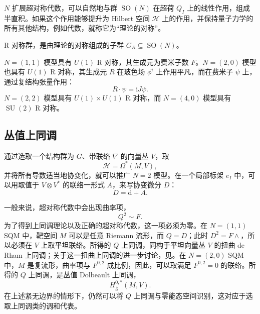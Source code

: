$N$ 扩展超对称代数，可以自然地与群 $\operatorname{SO}(N)$ 在超荷 $Q_I$ 上的线性作用，组成半直积。如果这个作用能够提升为 Hilbert 空间 $\mathcal{H}$ 上的作用，并保持量子力学的所有其他结构，例如代数，就称它为“理论的对称”。

\begin{definition}\label{def:3.1}
R 对称群，是由理论的对称组成的子群 $G_R\subseteq\operatorname{SO}(N)$。
\end{definition}

\begin{example*}
$N=(1,1)$ 模型具有 $U(1)$ R 对称，其生成元为费米子数 $F$。$N=(2,0)$ 模型也具有 $U(1)$ R 对称，其生成元 $R$ 在玻色场 $\phi^i$ 上作用平凡，而在费米子 $\psi$ 上，通过复结构张量作用：
\[
R\cdot\psi=\mathrm{i}J\psi.
\]
$N=(2,2)$ 模型具有 $U(1)\times U(1)$ R 对称，而 $N=(4,0)$ 模型具有 $\operatorname{SU}(2)$ R 对称。
\end{example*}

\subsection{丛值上同调}\label{sec:3.1.5}

通过选取一个结构群为 $G$、带联络 $\nabla$ 的向量丛 $V$，取
\[
\mathcal{H}=\Omega^*(M,V),
\]
并将所有导数适当地协变化，就可以推广 $N=2$ 模型。在一个局部标架 $e_I$ 中，可以用取值于 $V\otimes V^*$ 的联络一形式 $A$，来写协变微分 $D$：
\[
D=\mathrm{d}+A.
\]

一般来说，超对称代数中会出现曲率项，
\[
Q^2\sim F.
\]
为了得到上同调理论以及正确的超对称代数，这一项必须为零。在 $N=(1,1)$ SQM 中，靶空间 $M$ 可以是任意 Riemann 流形，而 $Q=D$；此时 $D^2=F\wedge$，所以必须在 $V$ 上取平坦联络。所得的 $Q$ 上同调，同构于平坦向量丛 $V$ 的扭曲 de Rham 上同调；关于这一扭曲上同调的进一步讨论，见。在 $N=(2,0)$ SQM 中，$M$ 是复流形，曲率项与 $F^{0,2}$ 成比例，因此，可以取满足 $F^{0,2}=0$ 的联络。所得的 $Q$ 上同调，是丛值 Dolbeault 上同调，
\[
H^{0,*}_{\bar\partial}(M,V).
\]
在上述紧无边界的情形下，仍然可以将 $Q$ 上同调与零能态空间识别，这对应于选取上同调类的调和代表。

